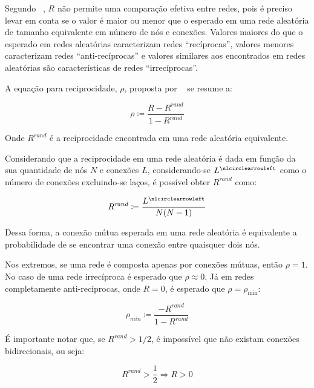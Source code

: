\documentclass[12pt,a4paper]{article}
\theoremstyle{hypo}
\newcommand{\defn}{\coloneqq} %
\newcommand{\noloop}[1]{#1^\nlcirclearrowleft} %
\begin{document}
Segundo ~, $R$ não permite uma comparação efetiva entre redes, pois é preciso levar em conta se o valor é maior ou menor que o esperado em uma rede aleatória de tamanho equivalente em número de nós e conexões. Valores maiores do que o esperado em redes aleatórias caracterizam redes \enquote{recíprocas}, valores menores caracterizam redes \enquote{anti-recíprocas} e valores similares aos encontrados em redes aleatórias são características de redes \enquote{irrecíprocas}.

A equação para reciprocidade, $\rho$, proposta por ~ se resume a:

\begin{equation} \label{eq:reciprocidade-rand}
\rho \defn \frac{R - R^\textit{rand}}{1 - R^\textit{rand}}
\end{equation}

Onde $R^\textit{rand}$ é a reciprocidade encontrada em uma rede aleatória equivalente.

Considerando que a reciprocidade em uma rede aleatória é dada em função da sua quantidade de nós $N$ e conexões $L$, considerando-se $\noloop{L}$ como o número de conexões excluindo-se laços, é possível obter $R^\textit{rand}$ como:

\begin{equation}
R^\textit{rand} \defn \frac{\noloop{L}}{N(N - 1)}
\end{equation}

Dessa forma, a conexão mútua esperada em uma rede aleatória é equivalente a probabilidade de se encontrar uma conexão entre quaisquer dois nós. 

Nos extremos, se uma rede é composta apenas por conexões mútuas, então $\rho = 1$. No caso de uma rede irrecíproca é esperado que $\rho \approx 0$. Já em redes completamente anti-recíprocas, onde $R = 0$, é esperado que $\rho = \rho_\text{min}$:

\begin{equation}
\rho_\textit{min} \defn \frac{- R^\textit{rand}}{1 - R^\textit{rand}}
\end{equation}

É importante notar que, se $R^\textit{rand} > 1/2$, é impossível que não existam conexões bidirecionais, ou seja:

\begin{equation}
R^\textit{rand} > \frac{1}{2} \Rightarrow R > 0
\end{equation}
\end{document}

